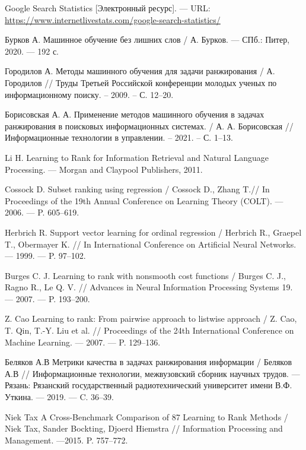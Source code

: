 
\renewcommand\bibname{СПИСОК ИСПОЛЬЗОВАННЫХ ИСТОЧНИКОВ}
\begin{thebibliography}{}

 Google Search Statistics [Электронный ресурс]. --- URL: \url{https://www.internetlivestats.com/google-search-statistics/}

 Бурков А. Машинное обучение без лишних слов / А. Бурков. --- СПб.: Питер, 2020. --- 192 с.

 Городилов А. Методы машинного обучения для задачи ранжирования / А. Городилов // Труды Третьей Российской конференции молодых ученых по информационному поиску. – 2009. – С. 12--20.

 Борисовская А. А. Применение методов машинного обучения в задачах ранжирования в поисковых информационных системах. / А. А. Борисовская // Информационные технологии в управлении. – 2021. – С. 1--13.

 Li H. Learning to Rank for Information Retrieval and Natural Language Processing. —
Morgan and Claypool Publishers, 2011.

 Cossock D. Subset ranking using regression / Cossock D., Zhang T.// In Proceedings of the 19th Annual Conference on Learning Theory (COLT). --- 2006. --- P. 605–619.

 Herbrich R. Support vector learning for ordinal regression / Herbrich R., Graepel T., Obermayer K. // In International Conference on Artificial Neural Networks. --- 1999. ---
P. 97--102.

 Burges C. J. Learning to rank with nonsmooth cost functions / Burges C. J., Ragno R., Le Q. V. // Advances in Neural Information Processing Systems 19. --- 2007. --- P. 193--200.

 Z. Cao Learning to rank: From pairwise approach to listwise approach / Z. Cao, T. Qin,
T.-Y. Liu et al. // Proceedings of the 24th International Conference on Machine Learning. --- 2007. --- P. 129--136.

 Беляков А.В Метрики качества в задачах ранжирования информации / Беляков А.В // Информационные технологии, межвузовский сборник научных трудов. --- Рязань: Рязанский государственный радиотехнический университет имени В.Ф. Уткина. --- 2019. --- C. 36--39.

 Niek Tax A Cross-Benchmark Comparison of 87 Learning to Rank Methods / Niek Tax, Sander Bockting, Djoerd Hiemstra // Information Processing and Management. ---2015. P. 757--772.

\end{thebibliography}


